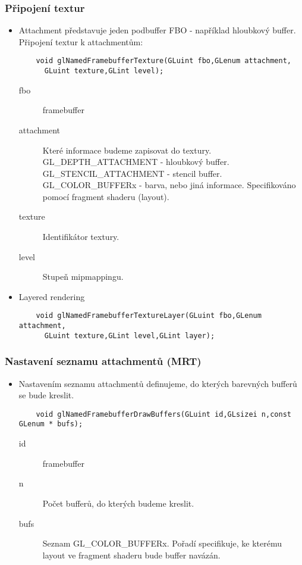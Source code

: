 \begin{frame}[fragile]
\frametitle{Připojení textur}
  \begin{itemize}
    \item{
    Attachment představuje jeden podbuffer FBO - například hloubkový buffer.
    Připojení textur k attachmentům:
    {\scriptsize
    \begin{verbatim}
    void glNamedFramebufferTexture(GLuint fbo,GLenum attachment,
      GLuint texture,GLint level);
    \end{verbatim}
    }
    \begin{description}
    \item[fbo] framebuffer
    \item[attachment] Které informace budeme zapisovat do textury.
    GL\_DEPTH\_ATTACHMENT - hloubkový buffer.
    GL\_STENCIL\_ATTACHMENT - stencil buffer.
    GL\_COLOR\_BUFFERx - barva, nebo jiná informace.
    Specifikováno pomocí fragment shaderu (layout).
    \item[texture] Identifikátor textury.
    \item[level] Stupeň mipmappingu.
    \end{description}
    }
    \item Layered rendering
    {\scriptsize
    \begin{verbatim}
    void glNamedFramebufferTextureLayer(GLuint fbo,GLenum attachment,
      GLuint texture,GLint level,GLint layer);
    \end{verbatim}
    }
  \end{itemize}
\end{frame}

\begin{frame}[fragile]
\frametitle{Nastavení seznamu attachmentů (MRT)}
  \begin{itemize}
    \item{
    Nastavením seznamu attachmentů definujeme, do kterých barevných bufferů se bude kreslit.
    {\scriptsize
    \begin{verbatim}
    void glNamedFramebufferDrawBuffers(GLuint id,GLsizei n,const GLenum * bufs);
    \end{verbatim}
    }
    \begin{description}
    \item[id] framebuffer
    \item[n] Počet bufferů, do kterých budeme kreslit.
    \item[bufs] Seznam GL\_COLOR\_BUFFERx.
    Pořadí specifikuje, ke kterému layout ve fragment shaderu bude buffer navázán.
    \end{description}
    }
  \end{itemize}
\end{frame}

